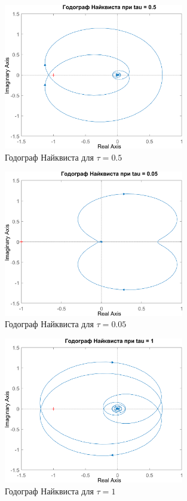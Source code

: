 \begin{figure}[H]
    \centering
    \centering
    \includegraphics[width=0.7\textwidth, trim={0cm 0cm 0cm 0cm}]{../images/3_1_1_hod.png}
    \caption{Годограф Найквиста для $\tau = 0.5$}
\end{figure}

\begin{figure}[H]
    \centering
    \centering
    \includegraphics[width=0.7\textwidth, trim={0cm 0cm 0cm 0cm}]{../images/3_1_2_hod.png}
    \caption{Годограф Найквиста для $\tau = 0.05$}
\end{figure}

\begin{figure}[H]
    \centering
    \centering
    \includegraphics[width=0.7\textwidth, trim={0cm 0cm 0cm 0cm}]{../images/3_1_3_hod.png}
    \caption{Годограф Найквиста для $\tau = 1$}
\end{figure}

